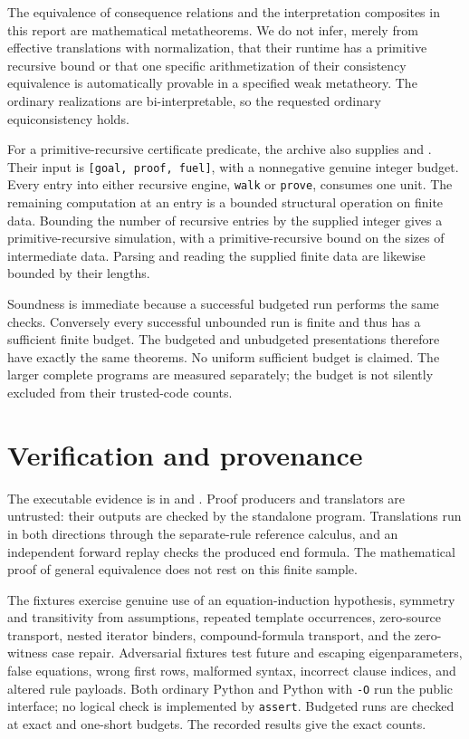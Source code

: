 \documentclass[11pt,letterpaper]{article}
\theoremstyle{definition}\newtheorem{definition}[theorem]{Definition}
\theoremstyle{remark}\newtheorem{remark}[theorem]{Remark}
\begin{document}
The equivalence of consequence relations and the interpretation composites
in this report are mathematical metatheorems. We do not infer, merely from
effective translations with normalization, that their runtime has a primitive
recursive bound or that one specific arithmetization of their consistency
equivalence is automatically provable in a specified weak metatheory.
The ordinary realizations are bi-interpretable, so the requested ordinary
equiconsistency holds.

For a primitive-recursive certificate predicate, the archive also supplies
 and
. Their input is
\texttt{[goal, proof, fuel]}, with a nonnegative genuine integer budget.
Every entry into either recursive engine, \texttt{walk} or \texttt{prove},
consumes one unit. The remaining computation at an entry is a bounded
structural operation on finite data. Bounding the number of recursive entries
by the supplied integer gives a primitive-recursive simulation, with a
primitive-recursive bound on the sizes of intermediate data. Parsing and
reading the supplied finite data are likewise bounded by their lengths.

Soundness is immediate because a successful budgeted run performs the same
checks. Conversely every successful unbounded run is finite and thus has a
sufficient finite budget. The budgeted and unbudgeted presentations therefore
have exactly the same theorems. No uniform sufficient budget is claimed.
The larger complete programs are measured separately; the budget is not
silently excluded from their trusted-code counts.

\section{Verification and provenance}
\label{sec:verification}

The executable evidence is in  and .
Proof producers and translators are untrusted: their outputs are checked by
the standalone program. Translations run in both directions through the
separate-rule reference calculus, and an independent forward replay checks
the produced end formula. The mathematical proof of general equivalence does
not rest on this finite sample.

The fixtures exercise genuine use of an equation-induction hypothesis,
symmetry and transitivity from assumptions, repeated template occurrences,
zero-source transport, nested iterator binders, compound-formula transport,
and the zero-witness case repair. Adversarial fixtures test future and
escaping eigenparameters, false equations, wrong first rows, malformed
syntax, incorrect clause indices, and altered rule payloads. Both ordinary
Python and Python with \texttt{-O} run the public interface; no logical check
is implemented by \texttt{assert}. Budgeted runs are checked at exact and
one-short budgets. The recorded results give the exact counts.
\end{document}
